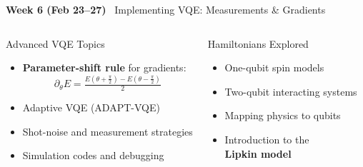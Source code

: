 \documentclass[aspectratio=169,10pt]{beamer}
\newcommand{\week}[1]{\textcolor{blue!60!black}{\textbf{#1}}}
\begin{document}
\begin{frame}{\week{Week 6 (Feb 23--27)} \ Implementing VQE: Measurements \& Gradients}
  \begin{columns}[T]
      \begin{block}{Advanced VQE Topics}
        \begin{itemize}
          \item \textbf{Parameter-shift rule} for gradients:
                \[
                  \partial_\theta E = \tfrac{E(\theta+\frac\pi2)-E(\theta-\frac\pi2)}{2}
                \]
          \item Adaptive VQE (ADAPT-VQE)
          \item Shot-noise and measurement strategies
          \item Simulation codes and debugging
        \end{itemize}
      \end{block}
      \begin{block}{Hamiltonians Explored}
        \begin{itemize}
          \item One-qubit spin models
          \item Two-qubit interacting systems
          \item Mapping physics to qubits
          \item Introduction to the\\
                \textbf{Lipkin model}
        \end{itemize}
      \end{block}
  \end{columns}
\end{frame}
\end{document}
